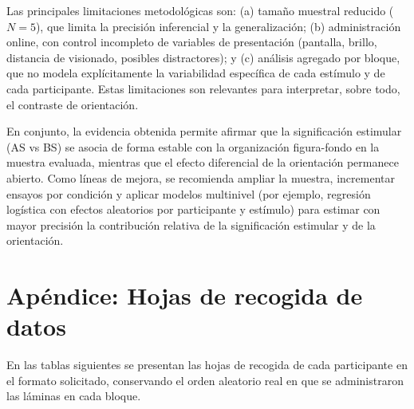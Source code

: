 \documentclass[stu, 12pt, letterpaper, donotrepeattitle, floatsintext, natbib]{apa7}
\begin{document}
Las principales limitaciones metodológicas son: (a) tamaño muestral reducido (\(N=5\)), que limita la precisión inferencial y la generalización; (b) administración online, con control incompleto de variables de presentación (pantalla, brillo, distancia de visionado, posibles distractores); y (c) análisis agregado por bloque, que no modela explícitamente la variabilidad específica de cada estímulo y de cada participante. Estas limitaciones son relevantes para interpretar, sobre todo, el contraste de orientación.

En conjunto, la evidencia obtenida permite afirmar que la significación estimular (AS vs BS) se asocia de forma estable con la organización figura-fondo en la muestra evaluada, mientras que el efecto diferencial de la orientación permanece abierto. Como líneas de mejora, se recomienda ampliar la muestra, incrementar ensayos por condición y aplicar modelos multinivel (por ejemplo, regresión logística con efectos aleatorios por participante y estímulo) para estimar con mayor precisión la contribución relativa de la significación estimular y de la orientación.


\section*{Apéndice: Hojas de recogida de datos}
En las tablas siguientes se presentan las hojas de recogida de cada participante en el formato solicitado, conservando el orden aleatorio real en que se administraron las láminas en cada bloque.
\end{document}
